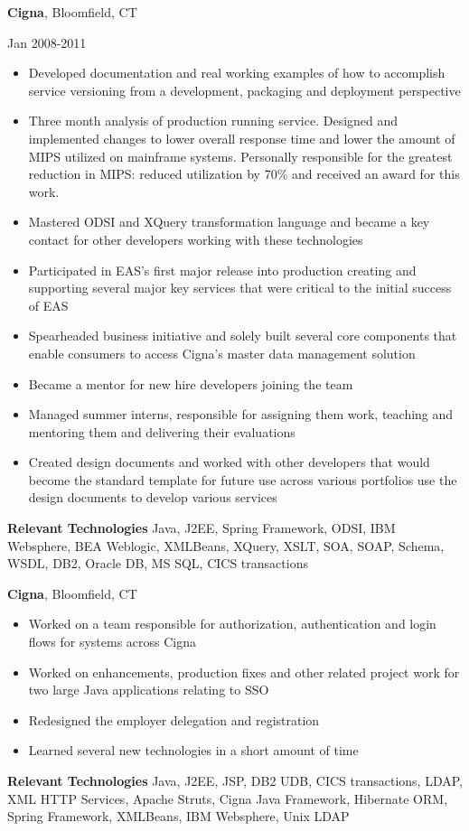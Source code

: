 \documentclass[a4paper,online]{adcv}
\begin{document}
\begin{adcvtabletwo}
  \adcvrowskip
  {\textbf{Cigna}, Bloomfield, CT}
  
   {Jan 2008-2011}
  \begin{itemize}
    \item Developed documentation and real working examples of how to accomplish service versioning from a development, packaging and deployment perspective
    \item Three month analysis of production running service.  Designed and implemented changes to lower overall response time and lower the amount of MIPS utilized on mainframe systems. Personally responsible for the greatest reduction in MIPS: reduced utilization by 70\% and received an award for this work.
    \item Mastered ODSI and XQuery transformation language and became a key contact for other developers working with these technologies
    \item Participated in EAS's first major release into production creating and supporting several major key services that were critical to the initial success of EAS
    \item Spearheaded business initiative and solely built several core components that enable consumers to access Cigna's master data management solution
    \item Became a mentor for new hire developers joining the team
    \item Managed summer interns, responsible for assigning them work, teaching and mentoring them and delivering their evaluations
    \item Created design documents and worked with other developers that would become the standard template for future use across various portfolios use the design documents to develop various services

  \end{itemize}
  \adcvrowskip
  \textbf{Relevant Technologies} Java, J2EE, Spring Framework, ODSI, IBM Websphere, BEA Weblogic, XMLBeans, XQuery, XSLT, SOA, SOAP, Schema, WSDL, DB2, Oracle DB, MS SQL, CICS transactions
  
  \adcvrowskip
  {\textbf{Cigna}, Bloomfield, CT}
  
  \begin{itemize}
    \item Worked on a team responsible for authorization, authentication and login flows for systems across Cigna
    \item Worked on enhancements, production fixes and other related project work for two large Java applications relating to SSO
    \item Redesigned the employer delegation and registration
    \item Learned several new technologies in a short amount of time
  \end{itemize}
  \adcvrowskip
  \textbf{Relevant Technologies} Java, J2EE, JSP, DB2 UDB, CICS transactions, LDAP, XML HTTP Services, Apache Struts, Cigna Java Framework, Hibernate ORM, Spring Framework, XMLBeans, IBM Websphere, Unix LDAP


\end{adcvtabletwo}
\end{document}
